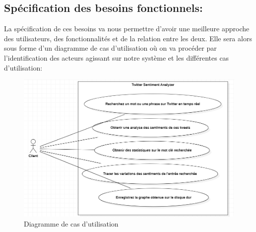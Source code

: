 \subsection{Spécification des besoins fonctionnels:}
La spécification de ces besoins va nous permettre d’avoir une meilleure approche des utilisateurs, des fonctionnalités et de la relation entre les deux. Elle sera alors sous forme d'un diagramme de cas d’utilisation où on va procéder par l'identification des acteurs agissant sur notre système et les différentes cas d'utilisation: \\
\begin{figure}[H]
    \centering
    \includegraphics[width=\textwidth]{etude-theorique-conception/assets/useCase.png}
    \caption{Diagramme de cas d'utilisation}
    \label{fig:my_label}
\end{figure}

